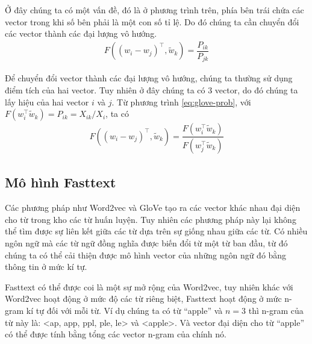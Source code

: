 Ở đây chúng ta có một vấn đề, đó là ở phương trình trên, phía bên trái chứa các vector trong khi số bên phải là một con số tỉ lệ. Do đó chúng ta cần chuyển đổi các vector thành các đại lượng vô hướng.
\begin{align}
    \label{eq:glove-prob}
    F((w_i-w_j)^\intercal,\tilde w_k)=\dfrac{P_{ik}}{P_{jk}}
\end{align}

Để chuyển đổi vector thành các đại lượng vô hướng, chúng ta thường sử dụng điểm tích của hai vector. Tuy nhiên ở đây chúng ta có $3$ vector, do đó chúng ta lấy hiệu của hai vector $i$ và $j$. Từ phương trình \ref{eq:glove-prob}, với $F(w_i^\intercal\tilde w_k)=P_{ik}=X_{ik}/X_i$, ta có
\begin{align}
    F((w_i-w_j)^\intercal,\tilde w_k)=\dfrac{F(w_i^\intercal\tilde w_k)}{F(w_j^\intercal\tilde w_k)}
\end{align}

\subsection{Mô hình Fasttext}
Các phương pháp như Word2vec và GloVe tạo ra các vector khác nhau đại diện cho từ trong kho các từ huấn luyện. Tuy nhiên các phương pháp này lại không thể tìm được sự liên kết giữa các từ dựa trên sự giống nhau giữa các từ. Có nhiều ngôn ngữ mà các từ ngữ đồng nghĩa được biến đổi từ một từ ban đầu, từ đó chúng ta có thể cải thiện được mô hình vector của những ngôn ngữ đó bằng thông tin ở mức kí tự.

Fasttext có thể được coi là một sự mở rộng của Word2vec, tuy nhiên khác với Word2vec hoạt động ở mức độ các từ riêng biệt, Fasttext hoạt động ở mức n-gram kí tự đối với mỗi từ. Ví dụ chúng ta có từ ``apple'' và $n = 3$ thì n-gram của từ này là: <ap, app, ppl, ple, le> và <apple>. Và vector đại diện cho từ ``apple'' có thể được tính bằng tổng các vector n-gram của chính nó.

